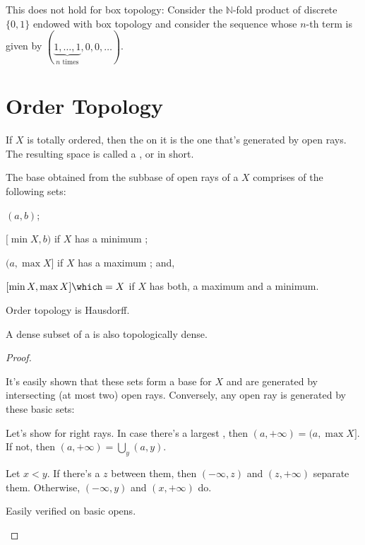 	\begin{rmk}
		This does not hold for box topology: Consider the $\mathbb N$-fold product of discrete $\{0, 1\}$ endowed with box topology and consider the sequence whose $n$-th term is given by $(\underbrace{1, \ldots, 1}_\text{$n$ times}, 0, 0, \ldots)$.
	\end{rmk}	


\section{Order Topology}\label{SEC: order topo}
	
	If $X$ is totally ordered, then the  on it is the one that's generated by open rays. The resulting space is called a , or  in short.

	\begin{lem}\label{LEM: triv things on order topo}
		\leavevmode
		\begin{mylist}
			\item The base obtained from the subbase of open rays of a \LOTS $X$ comprises of the following sets:
			\begin{mylist}
				\item $(a, b)$;
				\item $[\min X, b)$ if $X$ has a minimum \elt;
				\item $(a, \max X]$ if $X$ has a maximum \elt; and,
				\item $[\min X, \max X]\which = X$ if $X$ has both, a maximum and a minimum.
			\end{mylist}
			
			\item Order topology is Hausdorff.
			
			\item A dense subset of a \LOTS is also topologically dense.
		\end{mylist}
	\end{lem}
	
	\begin{proof}
		\begin{mylist}
			\item It's easily shown that these sets form a base for $X$ and are generated by intersecting (at most two) open rays. Conversely, any open ray is generated by these basic sets:
			\begin{subproof}
				Let's show for right rays. In case there's a largest \elt, then $(a, +\infty) = (a, \max X]$. If not, then $(a, +\infty) = \bigcup_y (a, y)$.
			\end{subproof}
			
			\item Let $x < y$. If there's a $z$ between them, then $(-\infty, z)$ and $(z, +\infty)$ separate them. Otherwise, $(-\infty, y)$ and $(x, +\infty)$ do.
			
			\item Easily verified on basic opens.
			\qedhere
		\end{mylist}
	\end{proof}
	
